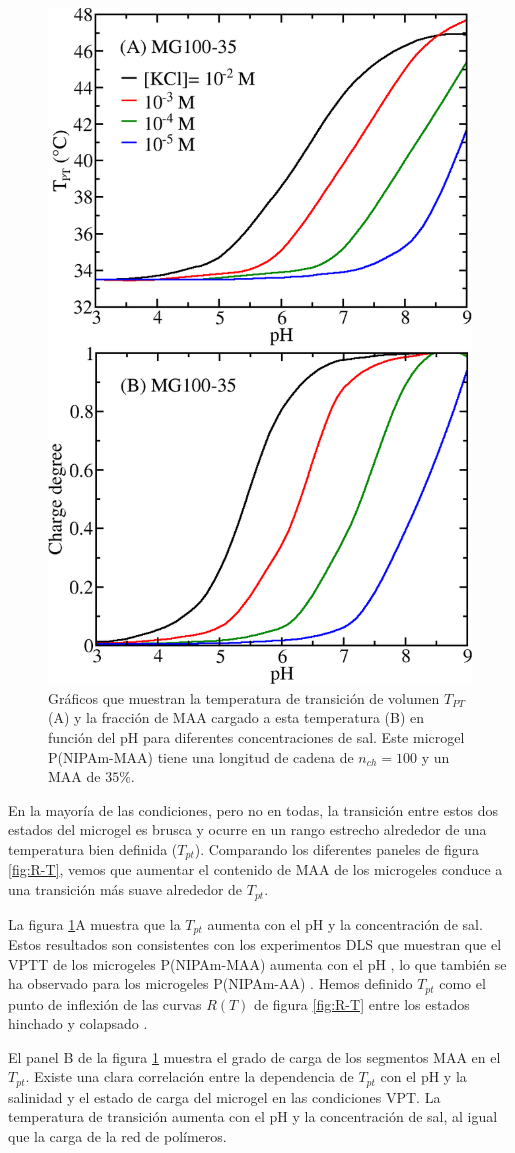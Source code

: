 \begin{figure}[!htb]
	\centering
	\includegraphics[width=0.5\linewidth]{Figures/graph-gel/Tpt-pH.png}
	\caption{Gr\'aficos que muestran la temperatura de transici\'on de volumen $T_{PT}$ (A) y la fracci\'on de MAA cargado a esta temperatura (B) en funci\'on del pH para diferentes concentraciones de sal.
		Este microgel P(NIPAm-MAA) tiene una longitud de cadena de $n_{ch}=100$ y un MAA de $35\%$.}
	\label{fig:Tpt-pH}
\end{figure}


En la mayor\'ia de las condiciones, pero no en todas, la transici\'on entre estos dos estados del microgel es brusca y ocurre en un rango estrecho alrededor de una temperatura bien definida ($T_{pt}$).
Comparando los diferentes paneles de figura \ref{fig:R-T}, vemos que aumentar el contenido de MAA de los microgeles conduce a una transici\'on m\'as suave alrededor de $T_{pt}$.



La figura \ref{fig:Tpt-pH}A muestra que la $T_{pt}$ aumenta con el pH y la concentraci\'on de sal.
Estos resultados son consistentes con los experimentos DLS que muestran que el VPTT de los microgeles P(NIPAm-MAA) aumenta con el pH \addcite[Kleinen2008], lo que tambi\'en se ha observado para los microgeles P(NIPAm-AA) \addcite[CaprilesGonzalez2008].
Hemos definido $T_{pt}$ como el punto de inflexi\'on de las curvas $R(T)$ de figura \ref{fig:R-T} entre los estados hinchado y colapsado \addcite[Kratz2001].


El panel B de la figura \ref{fig:Tpt-pH} muestra el grado de carga de los segmentos MAA en el $T_{pt}$.
Existe una clara correlaci\'on entre la dependencia de $T_{pt}$ con el pH y la salinidad y el estado de carga del microgel en las condiciones VPT.
La temperatura de transici\'on aumenta con el pH y la concentraci\'on de sal, al igual que la carga de la red de pol\'imeros.

